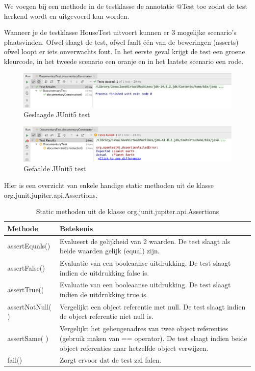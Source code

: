 We voegen bij een methode in de testklasse de annotatie @Test toe zodat de test herkend wordt en uitgevoerd kan worden. 

Wanneer je de testklasse HouseTest uitvoert kunnen er 3 mogelijke scenario's plaatsvinden. Ofwel slaagt de test, ofwel faalt \'e\'en van de beweringen (asserts) ofwel loopt er iets onverwachts fout. In het eerste geval krijgt de test een groene kleurcode, in het tweede scenario een oranje en in het laatste scenario een rode.

\begin{figure}[H]
  \includegraphics[width=\linewidth]{images/chapter-junit/junit_test_passed.png}
  \caption{Geslaagde JUnit5 test}
  \label{fig:test_passed}
\end{figure}

\begin{figure}[H]
  \includegraphics[width=\linewidth]{images/chapter-junit/junit_test_failed.png}
  \caption{Gefaalde JUnit5 test}
  \label{fig:test_failed}
\end{figure}

Hier is een overzicht van enkele handige static methoden uit de klasse org.junit.jupiter.api.Assertions. 

\begin{table}[h!]
\centering
\begin{tabularx}{\textwidth}{| l | X |}
 \hline
 Methode & Betekenis\\ 
 \hline\hline
assertEquals() & Evalueert de gelijkheid van 2 waarden. De test slaagt als beide
waarden gelijk (equal) zijn.\\
\hline
assertFalse() & Evaluatie van een booleaanse uitdrukking. De test slaagt indien
de uitdrukking false is.\\
\hline
assertTrue() & Evaluatie van een booleaanse uitdrukking. De test slaagt indien
de uitdrukking true is.\\
\hline
assertNotNull( ) & Vergelijkt een object referentie met null. De test slaagt indien de
object referentie niet null is.\\
\hline
assertSame( ) & Vergelijkt het geheugenadres van twee object referenties
(gebruik maken van == operator). De test slaagt indien beide
object referenties naar hetzelfde object verwijzen.\\
\hline
fail() & Zorgt ervoor dat de test zal falen.\\
 \hline
\end{tabularx}
\caption{Static methoden uit de klasse org.junit.jupiter.api.Assertions}
\label{table:assertions}
\end{table}

